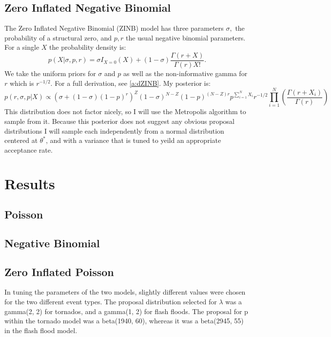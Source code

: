 \documentclass{article}
\begin{document}
\subsection{Zero Inflated Negative Binomial}
\label{ss:mZiNBinom}
The Zero Inflated Negative Binomial (ZINB) model has three parameters $\sigma,$ the probability of a structural zero, and $p,r$ the usual negative binomial parameters. 
For a single $X$ the probability density is: 
$$p(X|\sigma, p, r) = \sigma I_{X=0}(X) + (1-\sigma)\frac{\Gamma(r+X)}{\Gamma(r)X!}.$$
We take the uniform priors for $\sigma$ and $p$ as well as the non-informative gamma for $r$ which is $r^{-1/2}$. For a full derivation, see \ref{a:dZINB}. My posterior is:
$$p(r,\sigma, p|X)\propto\left(\sigma + (1-\sigma)(1-p)^r\right)^Z(1-\sigma)^{N-Z}(1-p)^{(N-Z)r}p^{\sum_{i=1}^NX_i}r^{-1/2}\prod_{i=1}^N\left(\frac{\Gamma(r+X_i)}{\Gamma(r)}\right)$$
This distribution does not factor nicely, so I will use the Metropolis algorithm to sample from it. 
Because this posterior does not suggest any obvious proposal distributions I will sample each independently from a normal distribution centered at $\theta^*$, and with a variance that is tuned to yeild an appropriate acceptance rate.

\section{Results}
\label{s:results}
\subsection{Poisson}
\label{ss:rPoisson}

\subsection{Negative Binomial}
\label{ss:rNBinom}

\subsection{Zero Inflated Poisson}
\label{ss:rZiPoisson}

In tuning the parameters of the two models, slightly different values were chosen for the two different event types. The proposal distribution selected for $\lambda$ was a gamma(2, 2) for tornados, and a gamma(1, 2) for flash floods. The proposal for p within the tornado model was a beta(1940, 60), whereas it was a beta(2945, 55) in the flash flood model. 
\end{document}
